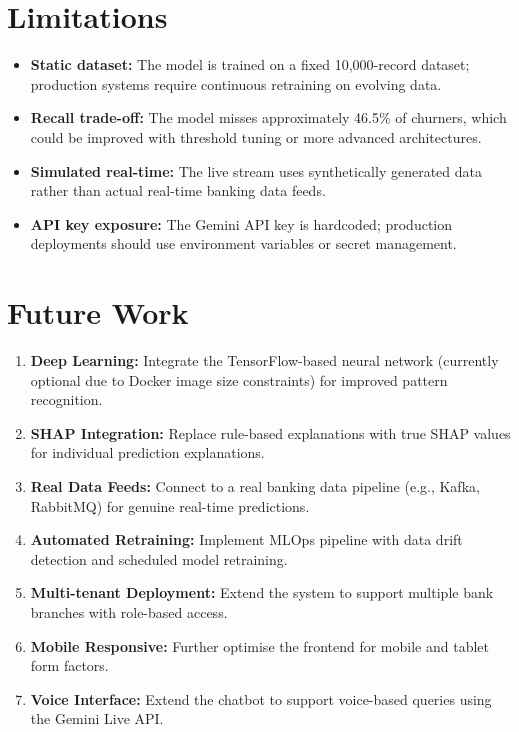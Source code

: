 \documentclass[12pt, a4paper]{report}
\begin{document}
\section{Limitations}

\begin{itemize}
    \item \textbf{Static dataset:} The model is trained on a fixed 10,000-record dataset; production systems require continuous retraining on evolving data.
    \item \textbf{Recall trade-off:} The model misses approximately 46.5\% of churners, which could be improved with threshold tuning or more advanced architectures.
    \item \textbf{Simulated real-time:} The live stream uses synthetically generated data rather than actual real-time banking data feeds.
    \item \textbf{API key exposure:} The Gemini API key is hardcoded; production deployments should use environment variables or secret management.
\end{itemize}

\section{Future Work}

\begin{enumerate}
    \item \textbf{Deep Learning:} Integrate the TensorFlow-based neural network (currently optional due to Docker image size constraints) for improved pattern recognition.
    \item \textbf{SHAP Integration:} Replace rule-based explanations with true SHAP values for individual prediction explanations.
    \item \textbf{Real Data Feeds:} Connect to a real banking data pipeline (e.g., Kafka, RabbitMQ) for genuine real-time predictions.
    \item \textbf{Automated Retraining:} Implement MLOps pipeline with data drift detection and scheduled model retraining.
    \item \textbf{Multi-tenant Deployment:} Extend the system to support multiple bank branches with role-based access.
    \item \textbf{Mobile Responsive:} Further optimise the frontend for mobile and tablet form factors.
    \item \textbf{Voice Interface:} Extend the chatbot to support voice-based queries using the Gemini Live API.
\end{enumerate}
\end{document}
